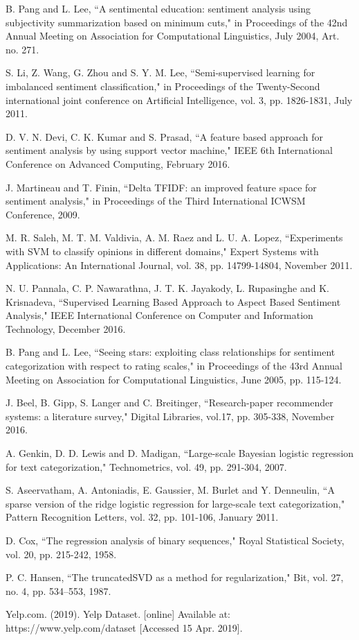 \documentclass[10pt, conference]{IEEEtran}
\begin{document}
\begin{thebibliography}{00}
		 B. Pang and L. Lee, ``A sentimental education: sentiment analysis using subjectivity summarization based on minimum cuts," in Proceedings of the 42nd Annual Meeting on Association for Computational Linguistics, July 2004, Art. no. 271.
		
		 S. Li, Z. Wang, G. Zhou and S. Y. M. Lee, ``Semi-supervised learning for imbalanced sentiment classification," in Proceedings of the Twenty-Second international joint conference on Artificial Intelligence, vol. 3, pp. 1826-1831, July 2011.
		
		 D. V. N. Devi, C. K. Kumar and S. Prasad, ``A feature based approach for sentiment analysis by using support vector machine," IEEE 6th International Conference on Advanced Computing, February 2016.
		
		 J. Martineau and T. Finin, ``Delta TFIDF: an improved feature space for sentiment analysis," in Proceedings of the Third International ICWSM Conference, 2009.
		
		 M. R. Saleh, M. T. M. Valdivia, A. M. Raez and L. U. A. Lopez, ``Experiments with SVM to classify opinions in different domains," Expert Systems with Applications: An International Journal, vol. 38, pp. 14799-14804, November 2011.
		
		 N. U. Pannala, C. P. Nawarathna, J. T. K. Jayakody, L. Rupasinghe and K. Krisnadeva, ``Supervised Learning Based Approach to Aspect Based Sentiment Analysis," IEEE International Conference on Computer and Information Technology, December 2016.
		
		 B. Pang and L. Lee, ``Seeing stars: exploiting class relationships for sentiment categorization with respect to rating scales," in  Proceedings of the 43rd Annual Meeting on Association for Computational Linguistics, June 2005, pp. 115-124.
		
		 J. Beel, B. Gipp, S. Langer and C. Breitinger, ``Research-paper recommender systems: a literature survey," Digital Libraries, vol.17, pp. 305-338, November 2016.
		
		 A. Genkin, D. D. Lewis and D. Madigan, ``Large-scale Bayesian logistic regression for text categorization," Technometrics, vol. 49, pp.  291-304, 2007.
		
		 S. Aseervatham, A. Antoniadis, E. Gaussier, M. Burlet and Y. Denneulin, ``A sparse version of the ridge logistic regression for large-scale text categorization," Pattern Recognition Letters, vol. 32, pp. 101-106, January 2011.
		
		 D. Cox, ``The regression analysis of binary sequences," Royal Statistical Society, vol. 20, pp. 215-242, 1958.
		
		 P. C. Hansen, ``The truncatedSVD as a method for regularization," Bit, vol. 27, no. 4, pp. 534–553, 1987.
		
		 Yelp.com. (2019). Yelp Dataset. [online] Available at: https://www.yelp.com/dataset [Accessed 15 Apr. 2019].

		
	\end{thebibliography}
	
\end{document}
